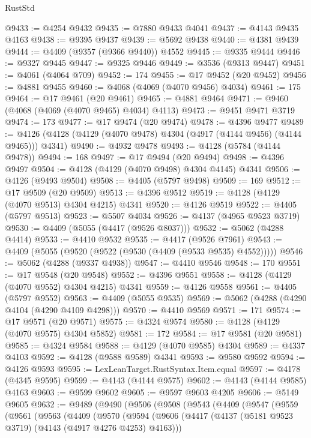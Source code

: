 \begin{lexlean}{RustStd}
\begin{coremodule}
@9433 := @4254 @9432
@9435 := @7880 @9433 @4041
@9437 := @4143 @9435 @4163
@9438 := @9395 @9437
@9439 := @5692 @9438
@9440 := @4381 @9439
@9444 := @4409 (@9357 (@9366 @9440)) @4552
@9445 := @9335 @9444
@9446 := @9327 @9445
@9447 := @9325 @9446
@9449 := @3536 (@9313 @9447)
@9451 := @4061 (@4064 @709)
@9452 := 174
@9455 := @17 @9452 (@20 @9452)
@9456 := @4881 @9455
@9460 := @4068 (@4069 (@4070 @9456) @4034)
@9461 := 175
@9464 := @17 @9461 (@20 @9461)
@9465 := @4881 @9464
@9471 := @9460 (@4068 (@4069 (@4070 @9465) @4034) @4113)
@9473 := @9451 @9471 @3719
@9474 := 173
@9477 := @17 @9474 (@20 @9474)
@9478 := @4396 @9477
@9489 := @4126 (@4128 (@4129 (@4070 @9478) @4304 (@4917 (@4144 @9456) (@4144 @9465))) @4341)
@9490 := @4932 @9478
@9493 := @4128 (@5784 (@4144 @9478))
@9494 := 168
@9497 := @17 @9494 (@20 @9494)
@9498 := @4396 @9497
@9504 := @4128 (@4129 (@4070 @9498) @4304 @4145) @4341
@9506 := @4126 (@9493 @9504)
@9508 := @4405 (@5797 @9498)
@9509 := 169
@9512 := @17 @9509 (@20 @9509)
@9513 := @4396 @9512
@9519 := @4128 (@4129 (@4070 @9513) @4304 @4215) @4341
@9520 := @4126 @9519
@9522 := @4405 (@5797 @9513)
@9523 := @5507 @4034
@9526 := @4137 (@4965 @9523 @3719)
@9530 := @4409 (@5055 (@4417 (@9526 @8037)))
@9532 := @5062 (@4288 @4414)
@9533 := @4410 @9532
@9535 := @4417 (@9526 @7961)
@9543 := @4409 (@5055 (@9520 (@9522 (@9530 (@4409 (@9533 @9535) @4552)))))
@9546 := @5062 (@4288 (@9337 @4938))
@9547 := @4410 @9546
@9548 := 170
@9551 := @17 @9548 (@20 @9548)
@9552 := @4396 @9551
@9558 := @4128 (@4129 (@4070 @9552) @4304 @4215) @4341
@9559 := @4126 @9558
@9561 := @4405 (@5797 @9552)
@9563 := @4409 (@5055 @9535)
@9569 := @5062 (@4288 (@4290 @4104 (@4290 @4109 @4298)))
@9570 := @4410 @9569
@9571 := 171
@9574 := @17 @9571 (@20 @9571)
@9575 := @4324 @9574
@9580 := @4128 (@4129 (@4070 @9575) @4304 @5852)
@9581 := 172
@9584 := @17 @9581 (@20 @9581)
@9585 := @4324 @9584
@9588 := @4129 (@4070 @9585) @4304
@9589 := @4337 @4103
@9592 := @4128 (@9588 @9589) @4341
@9593 := @9580 @9592
@9594 := @4126 @9593
@9595 := LexLeanTarget.RustSyntax.Item.equal
@9597 := @4178 (@4345 @9595)
@9599 := @4143 (@4144 @9575)
@9602 := @4143 (@4144 @9585) @4163
@9603 := @9599 @9602
@9605 := @9597 @9603 @4205
@9606 := @5149 @9605
@9632 := @9489
    (@9490
      (@9506
        (@9508
          (@9543
            (@4409
              (@9547
                (@9559
                  (@9561
                    (@9563
                      (@4409
                        (@9570
                          (@9594
                            (@9606
                              (@4417 (@4137 (@5181 @9523 @3719) (@4143 (@4917 @4276 @4253) @4163)))

\end{coremodule}
\end{lexlean}
